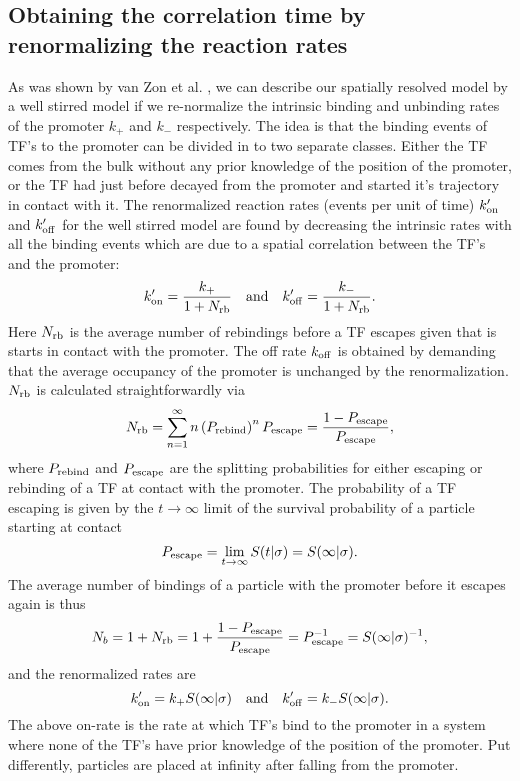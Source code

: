 \subsection{Obtaining the correlation time by renormalizing the reaction rates}
As was shown by van Zon et al. \cite{VanZon2006}, we can describe our spatially resolved model by a well stirred model if we re-normalize the intrinsic binding and unbinding rates of the promoter $k_+$ and $k_-$ respectively. The idea is that the binding events of TF's to the promoter can be divided in to two separate classes. Either the TF comes from the bulk without any prior knowledge of the position of the promoter, or the TF had just before decayed from the promoter and started it's trajectory in contact with it. The renormalized reaction rates (events per unit of time) $k'_{\rm on}$ and $k'_{\rm off}$ for the well stirred model are found by decreasing the intrinsic rates with all the binding events which are due to a spatial correlation between the TF's and the promoter:
\begin{equation}
 k'_{\rm on} = \frac{k_+}{1 + N_{\rm rb}} \quad \text{and} \quad k'_{\rm off} = \frac{k_-}{1 + N_{\rm rb}}.
\end{equation}
Here $N_{\rm rb}$ is the average number of rebindings before a TF escapes given that is starts in contact with the promoter. The off rate $k_{\rm off}$ is obtained by demanding that the average occupancy of the promoter is unchanged by the renormalization. $N_{\rm rb}$ is calculated straightforwardly via
\begin{equation}
 N_{\rm rb} = \sum_{n=1}^{\infty} n \left( P_{\rm rebind} \right)^n P_{\rm escape} = \frac{1-P_{\rm escape}}{P_{\rm escape}},
\end{equation}
where $P_{\rm rebind}$ and $P_{\rm escape}$ are the splitting probabilities for either escaping or rebinding of a TF at contact with the promoter. The probability of a TF escaping is given by the $t \to \infty$ limit of the survival probability of a particle starting at contact 
\begin{equation}
 P_{\rm escape} = \lim_{t \to \infty} S(t|\sigma) = S(\infty|\sigma).
\end{equation}
The average number of bindings of a particle with the promoter before it escapes again is thus
\begin{equation}
 N_b = 1 + N_{\rm rb} = 1 + \frac{1 - P_{\rm escape}}{P_{\rm escape}} = P_{\rm escape}^{-1} = S(\infty|\sigma)^{-1},
\end{equation}
and the renormalized rates are
\begin{equation}
 k'_{\rm on} = k_+ S(\infty|\sigma) \quad \text{and} \quad  k'_{\rm off} = k_- S(\infty|\sigma).
 \elabel{RenRates}
\end{equation}
The above on-rate is the rate at which TF's bind to the promoter in a system where none of the TF's have prior knowledge of the position of the promoter. Put differently, particles are placed at infinity after falling from the promoter. 

